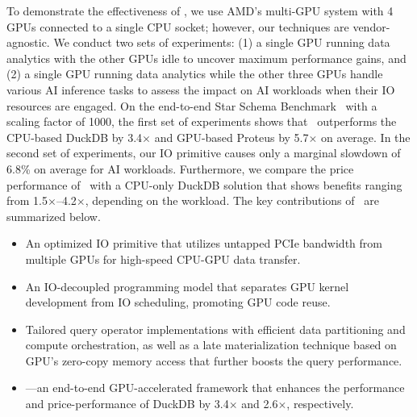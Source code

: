 To demonstrate the effectiveness of \THISWORK, we use AMD's multi-GPU system with 4 GPUs connected to a single CPU socket; however, our techniques are vendor-agnostic. 
We conduct two sets of experiments: (1) a single GPU running data analytics with the other GPUs idle to uncover maximum performance gains, and (2) a single GPU running data analytics while the other three GPUs handle various AI inference tasks to assess the impact on AI workloads when their IO resources are engaged. 
On the end-to-end Star Schema Benchmark~\cite{star-schema-sigmod-02} with a scaling factor of 1000, the first set of experiments shows that \THISWORK\ outperforms the CPU-based DuckDB by 3.4$\times$ and GPU-based Proteus by 5.7$\times$ on average. 
In the second set of experiments, our IO primitive causes only a marginal slowdown of 6.8\% on average for AI workloads. 
Furthermore, we compare the price performance of \THISWORK\ with a CPU-only DuckDB solution that shows benefits ranging from 1.5$\times$--4.2$\times$, depending on the workload.
The key contributions of \THISWORK\ are summarized below.


\begin{itemize}[leftmargin=*]
    \item An optimized IO primitive that utilizes untapped PCIe bandwidth from multiple GPUs for high-speed CPU-GPU data transfer.
    \item An IO-decoupled programming model that separates GPU kernel development from IO scheduling, promoting GPU code reuse.
    \item 
    Tailored query operator implementations with efficient data partitioning and compute orchestration, as well as a late materialization technique based on GPU's zero-copy memory access that further boosts the query performance.
    \item \THISWORK—an end-to-end GPU-accelerated framework that enhances the performance and price-performance of DuckDB by 3.4$\times$ and 2.6$\times$, respectively.
\end{itemize}



